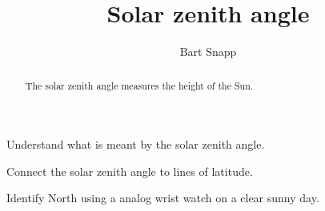 \documentclass[noauthor,nooutcomes,handout,hints,12pt]{ximera}
\title{Solar zenith angle}
\author{Bart Snapp}
\begin{document}
\begin{abstract}
  The solar zenith angle measures the height of the Sun.
\end{abstract}
\maketitle

\begin{listOutcomes}
\item Understand what is meant by the solar zenith angle.
\item Connect the solar zenith angle to lines of latitude.
\item Identify North using a analog wrist watch on a clear sunny day.
\end{listOutcomes}


\mynewpage
\end{document}
